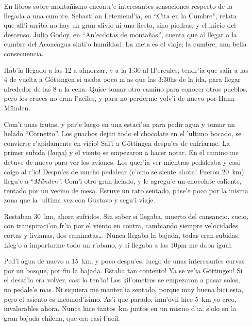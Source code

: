 En libros sobre monta\~nismo encontr'e interesantes sensaciones respecto de la
llegada a una cumbre. Sebasti'an Letemend'ia, en ``Cita en la Cumbre'', relata
que all'i arriba no hay un gran alivio ni una fiesta, sino piedras, y el inicio
del descenso. Julio Godoy, en ``An'ecdotas de monta\~nas'', cuenta que al llegar
a la cumbre del Aconcagua sinti'o humildad. La meta es el viaje; la cumbre, una
bella consecuencia.

Hab'ia llegado a las 12 a almorzar, y a la 1:30 al H'ercules; tendr'ia que salir
a las 4 de vuelta a G\"ottingen si usaba poco m'as que las 3:30hs de la ida,
para llegar alrededor de las 8 a la cena. Quise tomar otro camino para conocer
otros pueblos, pero los cruces no eran f'aciles, y para no perderme volv'i de
nuevo por Hann M\"unden.

Com'i unas frutas, y par'e luego en una estaci'on para pedir agua y tomar un
helado ``Cornetto''. Los guachos dejan todo el chocolate en el 'ultimo bocado,
\textexclamdown se convierte r'apidamente en vicio! Sal'i a G\"ottingen despu'es
de enfriarme. La primer subida (\emph{larga}) y el viento se empezaron a hacer
notar. En el camino me detuve de nuevo para ver los aviones. \textexclamdown Los
quer'ia ver mientras pedaleaba y casi caigo al r'io! Despu'es de mucho pedalear
(\textexclamdown c'omo se siente ahora! Fueron 20~km) llegu'e a
``\emph{M\"unden}''. Com'i otro gran helado, y le agregu'e un chocolate
caliente, tentado por un vecino de mesa. Estuve un rato sentado, pase'e poco por
la misma zona que la 'ultima vez con Gustavo y segu'i viaje.

Restaban 30~km, ahora sufridos. Sin saber si llegaba, muerto del cansancio,
sucio, con transpiraci'on fr'ia por el viento en contra, cambiando siempre
velocidades cortas y livianas, dos caminatas\ldots\ Nunca llegaba la bajada,
todas eran subidas. Lleg'o a importarme todo un r'abano, y si llegaba a las 10pm
me daba igual.

Ped'i agua de nuevo a 15~km, y poco despu'es, luego de unas interesantes curvas
por un bosque, por fin la bajada. \textexclamdown Estaba tan contento!
\textexclamdown Ya se ve'ia G\"ottingen! Si el desaf'io era volver,
\textexclamdown casi lo ten'ia! Los kil'ometros se empezaron a pasar solos, no
pedale'e mas. Ni siquiera me manten'ia sentado, porque muy buena bici esta, pero
el asiento es incomod'isimo. As'i que parado, inm'ovil hice 5~km yo creo,
invalorables ahora. Nunca hice tantos~km juntos en un mismo d'ia, s'olo en la
gran bajada chilena, que era casi f'acil.

